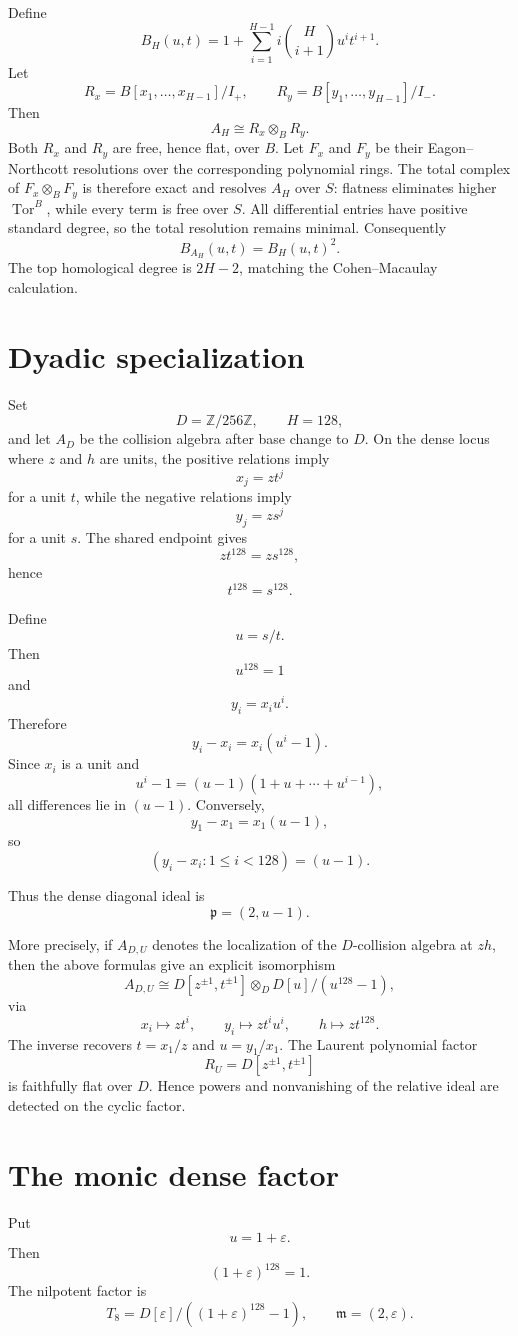 \documentclass[11pt]{article}
\theoremstyle{definition}
\newcommand{\Z}{\mathbb{Z}}
\begin{document}
Define
\[
B_H(u,t)
=
1+\sum_{i=1}^{H-1}
i\binom H{i+1}u^i t^{i+1}.
\]
Let
\[
R_x=B[x_1,\ldots,x_{H-1}]/I_+,
\qquad
R_y=B[y_1,\ldots,y_{H-1}]/I_-.
\]
Then
\[
A_H\cong R_x\otimes_B R_y.
\]
Both $R_x$ and $R_y$ are free, hence flat, over $B$. Let $F_x$ and $F_y$ be their Eagon--Northcott resolutions over the corresponding polynomial rings. The total complex of $F_x\otimes_B F_y$ is therefore exact and resolves $A_H$ over $S$: flatness eliminates higher $\operatorname{Tor}^B$, while every term is free over $S$. All differential entries have positive standard degree, so the total resolution remains minimal. Consequently
\[
\boxed{
B_{A_H}(u,t)=B_H(u,t)^2.
}
\]
The top homological degree is $2H-2$, matching the Cohen--Macaulay calculation.

\section{Dyadic specialization}
Set
\[
D=\Z/256\Z,\qquad H=128,
\]
and let $A_D$ be the collision algebra after base change to $D$. On the dense locus where $z$ and $h$ are units, the positive relations imply
\[
x_j=zt^j
\]
for a unit $t$, while the negative relations imply
\[
y_j=zs^j
\]
for a unit $s$. The shared endpoint gives
\[
zt^{128}=zs^{128},
\]
hence
\[
t^{128}=s^{128}.
\]

Define
\[
u=s/t.
\]
Then
\[
\boxed{u^{128}=1}
\]
and
\[
y_i=x_i u^i.
\]
Therefore
\[
y_i-x_i=x_i(u^i-1).
\]
Since $x_i$ is a unit and
\[
u^i-1=(u-1)(1+u+\cdots+u^{i-1}),
\]
all differences lie in $(u-1)$. Conversely,
\[
y_1-x_1=x_1(u-1),
\]
so
\[
\boxed{
(y_i-x_i:1\le i<128)=(u-1).
}
\]

Thus the dense diagonal ideal is
\[
\mathfrak p=(2,u-1).
\]

More precisely, if $A_{D,U}$ denotes the localization of the $D$-collision algebra at $zh$, then the above formulas give an explicit isomorphism
\[
\boxed{
A_{D,U}\cong
D[z^{\pm1},t^{\pm1}]
\otimes_D
D[u]/(u^{128}-1),
}
\]
via
\[
x_i\mapsto zt^i,\qquad
y_i\mapsto zt^iu^i,\qquad
h\mapsto zt^{128}.
\]
The inverse recovers $t=x_1/z$ and $u=y_1/x_1$. The Laurent polynomial factor
\[
R_U=D[z^{\pm1},t^{\pm1}]
\]
is faithfully flat over $D$. Hence powers and nonvanishing of the relative ideal are detected on the cyclic factor.

\section{The monic dense factor}
Put
\[
u=1+\varepsilon.
\]
Then
\[
(1+\varepsilon)^{128}=1.
\]
The nilpotent factor is
\[
T_8=
D[\varepsilon]/((1+\varepsilon)^{128}-1),
\qquad
\mathfrak m=(2,\varepsilon).
\]
\end{document}
